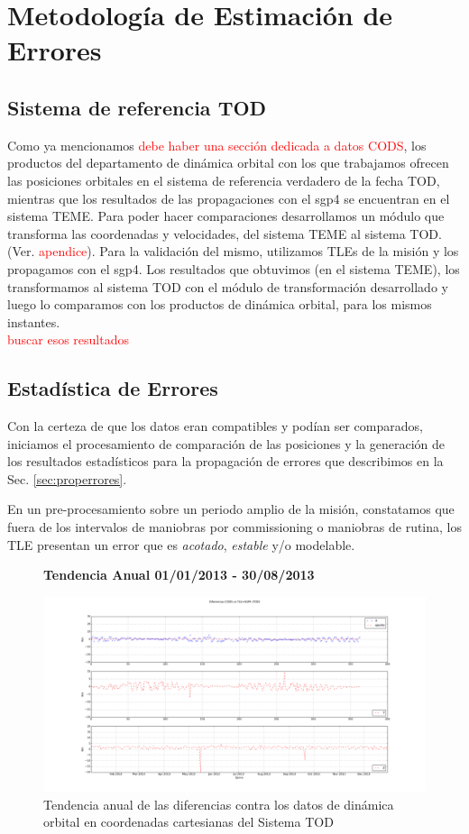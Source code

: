 \section{Metodolog\'ia de Estimaci\'on de Errores}
\subsection*{Sistema de referencia TOD}
Como ya mencionamos \textcolor{red}{debe haber una secci\'on dedicada a datos CODS}, los productos del departamento de din\'amica orbital con los que trabajamos ofrecen las posiciones orbitales en el sistema de referencia verdadero de la fecha \ac{TOD}, mientras que los resultados de las propagaciones con el sgp4 se encuentran en el sistema \ac{TEME}. Para poder hacer comparaciones desarrollamos un m\'odulo que transforma las coordenadas y velocidades, del sistema TEME al sistema TOD. (Ver. \textcolor{red}{apendice}).
Para la validaci\'on del mismo, utilizamos TLEs de la misi\'on y los propagamos con el sgp4. Los resultados que obtuvimos (en el sistema TEME), los transformamos al sistema TOD con el m\'odulo de transformaci\'on desarrollado y luego lo comparamos con los productos de din\'amica orbital, para los mismos instantes.\\

\textcolor{red}{buscar esos resultados}


\subsection*{Estad\'istica de Errores}
Con la certeza de que los datos eran compatibles y pod\'ian ser comparados, iniciamos el procesamiento de comparaci\'on de las posiciones y la generaci\'on de los resultados estad\'isticos para la propagaci\'on de errores que describimos en la Sec. \ref{sec:properrores}.

En un pre-procesamiento sobre un periodo amplio de la misi\'on, constatamos que fuera de los intervalos de maniobras por commissioning o maniobras de rutina, los TLE presentan un error que es {\it{acotado}}, {\it{estable}} y/o modelable.  

\begin{figure}[!h]
\centering
  \textbf{Tendencia Anual 01/01/2013 - 30/08/2013}\par\medskip
  \includegraphics[width=\textwidth]{imagenes/SACD2013todEjesajustados}
  \caption{Tendencia anual de las diferencias contra los datos de din\'amica orbital en coordenadas cartesianas del Sistema TOD}
\end{figure}


